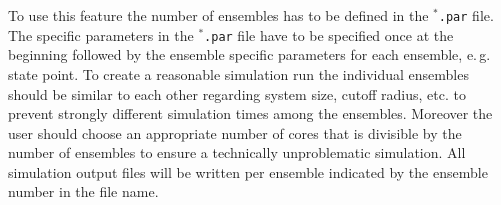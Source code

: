 To use this feature the number of ensembles has to be defined in the \texttt{$^{*}$\hspace{-3pt}.par} file. The specific parameters in the \texttt{$^{*}$\hspace{-3pt}.par} file have to be specified once at the beginning followed by the ensemble specific parameters for each ensemble, e.\,g. state point. To create a reasonable simulation run the individual ensembles should be similar to each other regarding system size, cutoff radius, etc. to prevent strongly different simulation times among the ensembles. Moreover the user should choose an appropriate number of cores that is divisible by the number of ensembles to ensure a technically unproblematic simulation. All simulation output files will be written per ensemble indicated by the ensemble number in the file name.







